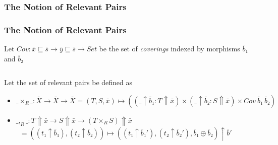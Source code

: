 \documentclass[aspectratio=169]{beamer}
\theoremstyle{remarkstyle}
\begin{document}
\frametitle{The Notion of Relevant Pairs}
\begin{frame}[fragile]
  \frametitle{The Notion of Relevant Pairs}
  \begin{definition}
    Let $Cov : \bar{x} ⊑ \bar{s} → \bar{y} ⊑ \bar{s} → Set$ be the set of \emph{coverings} indexed by morphisms $\bar{b}₁$ and $\bar{b}₂$
    \begin{columns}
      \begin{column}{0.2\textwidth}
        \begin{center}
        \end{center}
      \end{column}
      \begin{column}{0.2\textwidth}
        \begin{center}
        \end{center}
      \end{column}
      \begin{column}{0.2\textwidth}
        \begin{center}
        \end{center}
      \end{column}
      \begin{column}{0.2\textwidth}
        \begin{center}
        \end{center}
      \end{column}
    \end{columns}
  \end{definition}
  \begin{definition}
    Let the set of relevant pairs be defined as 
    \begin{itemize}
      \item $\_×_R\_ : \bar{X} → \bar{X} → \bar{X}  = (T, S, \bar{x}) ↦ ((\_ ↑ \bar{b}₁ : T ⇑ \bar{x}) × (\_ ↑ \bar{b}₂ : S ⇑ \bar{x}) × Cov \ \bar{b}₁ \ \bar{b}₂)$
      \item $\_,_R\_ : T ⇑ \bar{x} → S ⇑ \bar{x} → (T ×_R S) ⇑ \bar{x}$ 
      \\ \quad \quad \ $= (( t₁ ↑ \bar{b}₁), (t₂ ↑ \bar{b}₂)) ↦  ((t₁ ↑ \bar{b}₁') , (t₂ ↑ \bar{b}₂'), \bar{b}₁ ⊕ \bar{b}₂) ↑ \bar{b}'$ \\ 
    \end{itemize}
  \end{definition}
  
\end{frame}
\end{document}

